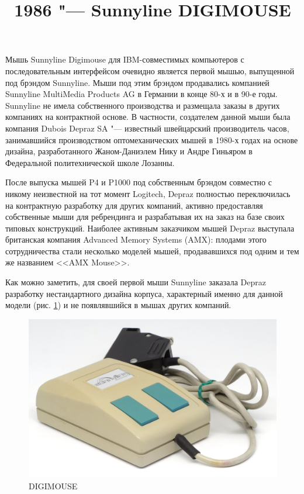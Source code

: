 \documentclass[11pt, a4paper]{article}
\begin{document}
\title{1986 "--- Sunnyline DIGIMOUSE}
\date{}
\maketitle
{}

Мышь Sunnyline Digimouse для IBM-совместимых компьютеров с последовательным интерфейсом очевидно является первой мышью, выпущенной под брэндом Sunnyline.
Мыши под этим брэндом продавались компанией Sunnyline MultiMedia Products AG в Германии в конце 80-х и в 90-е годы. Sunnyline не имела собственного производства и размещала заказы в других компаниях на контрактной основе. В частности, создателем данной мыши была компания Dubois Depraz SA "--- известный швейцарский производитель часов, занимавшийся производством оптомеханических мышей в 1980-х годах на основе дизайна, разработанного Жаном-Даниэлем Нику и Андре Гиньяром в Федеральной политехнической школе Лозанны.

После выпуска мышей P4 и P1000 под собственным брэндом совместно с никому неизвестной на тот момент Logitech, Depraz полностью переключилась на контрактную разработку для других компаний, активно предоставляя собственные мыши для ребрендинга и разрабатывая их на заказ на базе своих типовых конструкций. Наиболее активным заказчиком мышей Depraz выступала британская компания Advanced Memory Systems (AMX): плодами этого сотрудничества стали несколько моделей мышей, продававшихся под одним и тем же названием <<AMX Mouse>>.

Как можно заметить, для своей первой мыши Sunnyline заказала Depraz разработку нестандартного дизайна корпуса, характерный именно для данной модели (рис. \ref{fig:SunnylineDIGIMOUSEPic}) и не появлявшийся в мышах других компаний.

\begin{figure}[h]
   \centering
    \includegraphics[scale=0.75]{1986_sunnyline_digimouse/pic_30.jpg}
    \caption{DIGIMOUSE}
    \label{fig:SunnylineDIGIMOUSEPic}
\end{figure}
\end{document}
